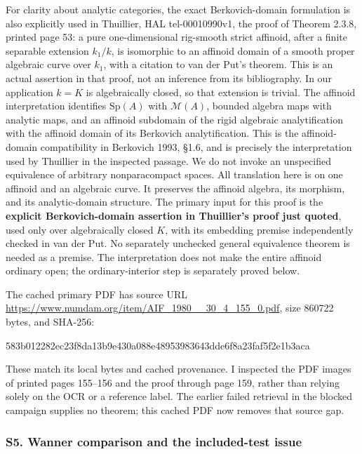 \documentclass[
  11pt,
]{article}
\newenvironment{Shaded}{}{}
\newcommand{\NormalTok}[1]{#1}
\begin{document}
For clarity about analytic categories, the exact Berkovich-domain
formulation is also explicitly used in Thuillier, HAL tel-00010990v1,
the proof of Theorem 2.3.8, printed page 53: a pure one-dimensional
rig-smooth strict affinoid, after a finite separable extension
\(k_1/k\), is isomorphic to an affinoid domain of a smooth proper
algebraic curve over \(k_1\), with a citation to van der Put's theorem.
This is an actual assertion in that proof, not an inference from its
bibliography. In our application \(k=K\) is algebraically closed, so
that extension is trivial. The affinoid interpretation identifies
\(\mathrm{Sp}(A)\) with \(\mathcal M(A)\), bounded algebra maps with
analytic maps, and an affinoid subdomain of the rigid algebraic
analytification with the affinoid domain of its Berkovich
analytification. This is the affinoid-domain compatibility in Berkovich
1993, §1.6, and is precisely the interpretation used by Thuillier in the
inspected passage. We do not invoke an unspecified equivalence of
arbitrary nonparacompact spaces. All translation here is on one affinoid
and an algebraic curve. It preserves the affinoid algebra, its morphism,
and its analytic-domain structure. The primary input for this proof is
the \textbf{explicit Berkovich-domain assertion in Thuillier's proof
just quoted}, used only over algebraically closed \(K\), with its
embedding premise independently checked in van der Put. No separately
unchecked general equivalence theorem is needed as a premise. The
interpretation does not make the entire affinoid ordinary open; the
ordinary-interior step is separately proved below.

The cached primary PDF has source URL
\url{https://www.numdam.org/item/AIF_1980__30_4_155_0.pdf}, size 860722
bytes, and SHA-256:

\begin{Shaded}
\begin{Highlighting}[]
\NormalTok{583b012282ec23f8da13b9e430a088e48953983643dde6f8a23faf5f2e1b3aca}
\end{Highlighting}
\end{Shaded}

These match its local bytes and cached provenance. I inspected the PDF
images of printed pages 155--156 and the proof through page 159, rather
than relying solely on the OCR or a reference label. The earlier failed
retrieval in the blocked campaign supplies no theorem; this cached PDF
now removes that source gap.

\subsubsection{S5. Wanner comparison and the included-test
issue}\label{s5.-wanner-comparison-and-the-included-test-issue}
\end{document}
